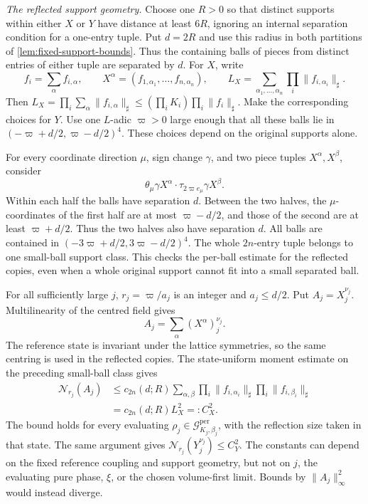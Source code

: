 \documentclass[11pt,letterpaper,reqno]{amsart}
\theoremstyle{definition}
\theoremstyle{remark}
\begin{document}
\emph{The reflected support geometry.}
Choose one \(R>0\) so that distinct supports within either
\(X\) or \(Y\) have distance at least \(6R\), ignoring
an internal separation condition for a one-entry tuple.
Put \(d=2R\) and use this radius in both partitions of
\cref{lem:fixed-support-bounds}. Thus the containing balls
of pieces from distinct entries of either tuple are
separated by \(d\). For \(X\), write
\[
 f_i=\sum_\alpha f_{i,\alpha},\qquad
 X^\alpha=(f_{1,\alpha_1},\ldots,f_{n,\alpha_n}),\qquad
 L_X=\sum_{\alpha_1,\ldots,\alpha_n}
                         \prod_i\|f_{i,\alpha_i}\|_\sharp.
\]
Then \(L_X=\prod_i\sum_\alpha\|f_{i,\alpha}\|_\sharp
\le(\prod_iK_i)\prod_i\|f_i\|_\sharp\).
Make the corresponding choices for \(Y\).
Use one \(L\)-adic \(\varpi>0\) large enough that
all these balls lie in
\((-\varpi+d/2,\varpi-d/2)^4\).
These choices depend on the original supports alone.

For every coordinate direction \(\mu\), sign change
\(\gamma\), and two piece tuples \(X^\alpha,X^\beta\),
consider
\[
 \theta_\mu\gamma X^\alpha\cdot
                        \tau_{2\varpi e_\mu}\gamma X^\beta.
\]
Within each half the balls have separation \(d\).
Between the two halves, the \(\mu\)-coordinates
of the first half are at most \(\varpi-d/2\),
and those of the second are at least
\(\varpi+d/2\). Thus the two halves also have
separation \(d\). All balls are contained in
\((-3\varpi+d/2,3\varpi-d/2)^4\).
The whole \(2n\)-entry tuple belongs to one
small-ball support class. This checks the
per-ball estimate for the reflected copies,
even when a whole original support cannot
fit into a small separated ball.

For all sufficiently large \(j\),
\(r_j=\varpi/a_j\) is an integer and
\(a_j\le d/2\). Put
\(A_j=X_j^{\nu_j}\). Multilinearity of the
centred field gives
\[
 A_j=\sum_\alpha (X^\alpha)_j^{\nu_j}.
\]
The reference state is invariant under the
lattice symmetries, so the same centring
is used in the reflected copies.
The state-uniform moment estimate on the
preceding small-ball class gives
\begin{equation}\label{eq:uniform-reflected-size}
 \begin{split}
 \mathcal N_{r_j}(A_j)
 &\le c_{2n}(d;R)
       \sum_{\alpha,\beta}
       \prod_i\|f_{i,\alpha_i}\|_\sharp
       \prod_i\|f_{i,\beta_i}\|_\sharp\\
 &=c_{2n}(d;R)L_X^2=:C_X^2.
 \end{split}
\end{equation}
The bound holds for every evaluating
\(\rho_j\in\mathcal G^{\mathrm{per}}_{K_j,\beta_j}\),
with the reflection size taken in that state.
The same argument gives
\(\mathcal N_{r_j}(Y_j^{\nu_j})\le C_Y^2\).
The constants can depend on the fixed reference
coupling and support geometry, but not on \(j\),
the evaluating pure phase, \(\xi\), or the
chosen volume-first limit. Bounds by
\(\|A_j\|_\infty^2\) would instead diverge.
\end{document}
